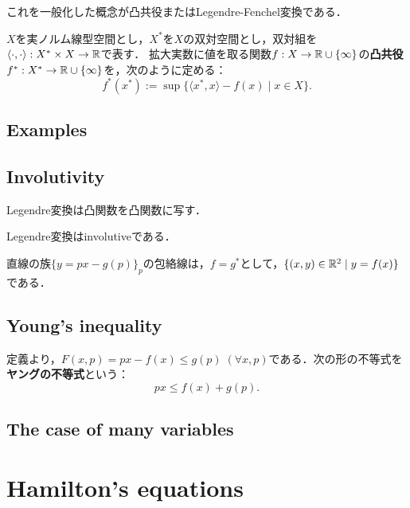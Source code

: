 \documentclass[uplatex,dvipdfmx]{jsreport}
\begin{document}
これを一般化した概念が凸共役またはLegendre-Fenchel変換である．

\begin{definition}
    $X$を実ノルム線型空間とし，$X^*$を$X$の双対空間とし，双対組を$\langle\cdot,\cdot\rangle:X^*\times X\to\mathbb{R}$で表す．
    拡大実数に値を取る関数$f:X\to\mathbb{R}\cup\{\infty\}$の\textbf{凸共役}$f^*:X^*\to\mathbb{R}\cup\{\infty\}$を，次のように定める：
    \[ f^*(x^*):=\sup\{\langle x^*,x\rangle-f(x)\mid x\in X\}. \]
\end{definition}

\subsection{Examples}

\subsection{Involutivity}

\begin{proposition}
    Legendre変換は凸関数を凸関数に写す．
\end{proposition}

\begin{theorem}
    Legendre変換はinvolutiveである．
\end{theorem}

\begin{corollary}
    直線の族$\{y=px-g(p)\}_{p}$の包絡線は，$f=g^*$として，$\{(x,y)\in\mathbb{R}^2\mid y=f(x)\}$である．
\end{corollary}

\subsection{Young's inequality}

\begin{definition}
    定義より，$F(x,p)=px-f(x)\le g(p)\;(\forall x,p)$である．次の形の不等式を\textbf{ヤングの不等式}という：
    \[ px\le f(x)+g(p). \]
\end{definition}

\subsection{The case of many variables}

\section{Hamilton's equations}
\end{document}
